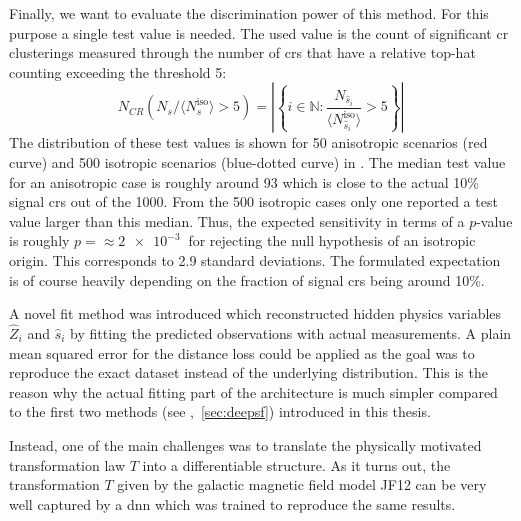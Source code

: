 Finally, we want to evaluate the discrimination power of this method. For this purpose a single test value is needed. The used value is the count of significant \gls{cr} clusterings measured through the number of \glspl{cr} that have a relative top-hat counting exceeding the threshold 5:
\begin{equation}
N_{CR} ( N_s / \langle N_s^\text{iso} \rangle > 5) = \left|\left\lbrace i \in \mathbb{N} : \frac{N_{\hat s_i}}{\langle N_{\hat s_i}^\text{iso} \rangle} > 5 \right\rbrace\right|
\end{equation}
The distribution of these test values is shown for 50 anisotropic scenarios (red curve) and 500 isotropic scenarios (blue-dotted curve) in . The median test value for an anisotropic case is roughly around 93 which is close to the actual 10\% signal \glspl{cr} out of the 1000. From the 500 isotropic cases only one reported a test value larger than this median. Thus, the expected sensitivity in terms of a \(p\)-value is roughly \(p=\approx \SI{2e-3}{}\) for rejecting the null hypothesis of an isotropic origin. This corresponds to 2.9 standard deviations. The formulated expectation is of course heavily depending on the fraction of signal \glspl{cr} being around 10\%.


A novel fit method was introduced which reconstructed hidden physics variables \(\hat Z_i\) and \(\hat s_i\) by fitting the predicted observations with actual measurements. A plain mean squared error for the distance loss could be applied as the goal was to reproduce the exact dataset instead of the underlying distribution. This is the reason why the actual fitting part of the architecture is much simpler compared to the first two methods (see ,~\ref{sec:deepsf}) introduced in this thesis.

Instead, one of the main challenges was to translate the physically motivated transformation law \(T\) into a differentiable structure. As it turns out, the transformation \(T\) given by the galactic magnetic field model JF12 can be very well captured by a \gls{dnn} which was trained to reproduce the same results.

